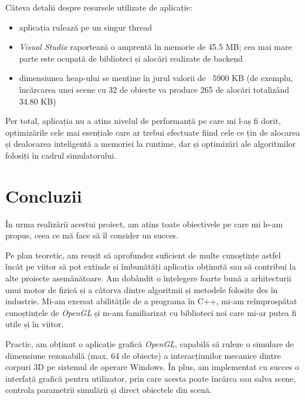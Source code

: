 \documentclass[12pt,a4paper]{report}
\begin{document}
Câteva detalii despre resursele utilizate de aplicație:
\begin{itemize}
	\item aplicația rulează pe un singur thread
	\item \textit{Visual Studio} raportează o amprentă în memorie de 45.5 MB; cea mai mare parte este ocupată de biblioteci și alocări realizate de backend
	\item dimensiunea heap-ului se menține în jurul valorii de ~5900 KB (de exemplu, încărcarea unei scene cu 32 de obiecte va produce 265 de alocări totalizând 34.80 KB)
\end{itemize}


Per total, aplicația nu a atins nivelul de performanță pe care mi l-aș fi dorit, optimizările cele mai esențiale care ar trebui efectuate fiind cele ce țin de alocarea și dealocarea inteligentă a memoriei la runtime, dar și optimizări ale algoritmilor folosiți în cadrul simulatorului.

\chapter{Concluzii}

În urma realizării acestui proiect, am atins toate obiectivele pe care mi le-am propus, ceea ce mă face să îl consider un succes.

Pe plan teoretic, am reușit să aprofundez suficient de multe cunoștințe astfel încât pe viitor să pot extinde și îmbunătăți aplicația obținută sau să contribui la alte proiecte asemănătoare. Am dobândit o înțelegere foarte bună a arhitecturii unui motor de fizică și a câtorva dintre algoritmii și metodele folosite des în industrie.  Mi-am exersat abilitățile de a programa în C++, mi-am reîmprospătat cunoștințele de \textit{OpenGL} și m-am familiarizat cu biblioteci noi care mi-ar putea fi utile și în viitor.

Practic, am obținut o aplicație grafică \textit{OpenGL}, capabilă să ruleze o simulare de dimensiune rezonabilă (max. 64 de obiecte) a interacțiunilor mecanice dintre corpuri 3D pe sistemul de operare Windows. În plus, am implementat cu succes o interfață grafică pentru utilizator, prin care acesta poate încărca sau salva scene, controla parametrii simulării și direct obiectele din scenă.
\end{document}
